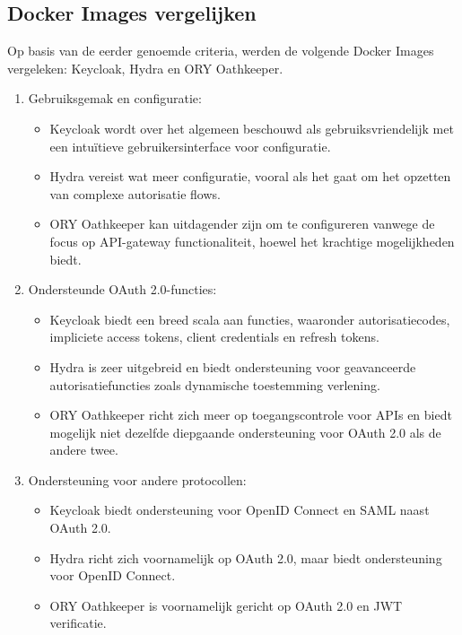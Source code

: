 \subsection{Docker Images vergelijken}%
\label{subsec:docker-images-vergelijken}
Op basis van de eerder genoemde criteria, werden de volgende Docker Images vergeleken: Keycloak, Hydra en ORY Oathkeeper.

\begin{enumerate}
  \item Gebruiksgemak en configuratie:
  \begin{itemize}
    \item Keycloak wordt over het algemeen beschouwd als gebruiksvriendelijk met een intuïtieve gebruikersinterface voor configuratie.
    \item Hydra vereist wat meer configuratie, vooral als het gaat om het opzetten van complexe autorisatie flows.
    \item ORY Oathkeeper kan uitdagender zijn om te configureren vanwege de focus op API-gateway functionaliteit, hoewel het krachtige mogelijkheden biedt.
  \end{itemize}
  
  \item Ondersteunde OAuth 2.0-functies:
  \begin{itemize}
    \item Keycloak biedt een breed scala aan functies, waaronder autorisatiecodes, impliciete access tokens, client credentials en refresh tokens.
    \item Hydra is zeer uitgebreid en biedt ondersteuning voor geavanceerde autorisatiefuncties zoals dynamische toestemming verlening.
    \item ORY Oathkeeper richt zich meer op toegangscontrole voor APIs en biedt mogelijk niet dezelfde diepgaande ondersteuning voor OAuth 2.0 als de andere twee.
  \end{itemize}
  
  \item Ondersteuning voor andere protocollen:
  \begin{itemize}
    \item Keycloak biedt ondersteuning voor OpenID Connect en SAML naast OAuth 2.0.
    \item Hydra richt zich voornamelijk op OAuth 2.0, maar biedt ondersteuning voor OpenID Connect.
    \item ORY Oathkeeper is voornamelijk gericht op OAuth 2.0 en JWT verificatie.
  \end{itemize}
  

\end{enumerate}
